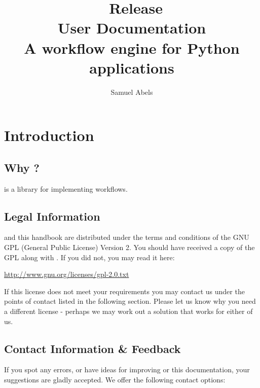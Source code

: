 \title{\productname\ Release \productversion\\
User Documentation\\
\vspace{5 mm}
\large A workflow engine for Python applications}
\author{Samuel Abels}


\maketitle
\tableofcontents

\newpage
\section{Introduction}
\subsection{Why \productname?}

\product is a library for implementing workflows.

\subsection{Legal Information}

\product and this handbook are distributed under the terms and conditions 
of the GNU GPL (General Public License) Version 2. You should have received 
a copy of the GPL along with \product. If you did not, you may read it here:

\vspace{1em}
\url{http://www.gnu.org/licenses/gpl-2.0.txt}
\vspace{1em}

If this license does not meet your requirements you may contact us under 
the points of contact listed in the following section. Please let us know 
why you need a different license - perhaps we may work out a solution 
that works for either of us.


\subsection{Contact Information \& Feedback}

If you spot any errors, or have ideas for improving \product or this 
documentation, your suggestions are gladly accepted.
We offer the following contact options: \\

